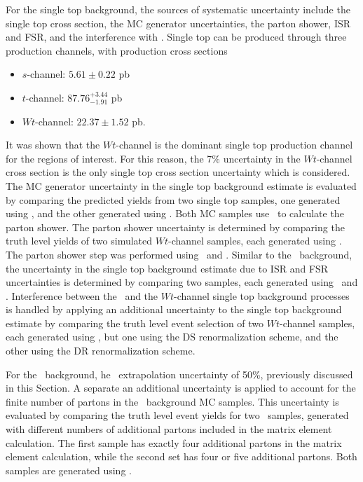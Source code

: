 For the single top background, the sources of systematic uncertainty
include the single top cross section, the MC generator uncertainties, the parton
shower, ISR and FSR, and the interference with \TTBAR.
Single top can be produced through three production channels, with production
cross sections
\begin{itemize}
  \item $s$-channel: $5.61 \pm 0.22$ pb
  \item $t$-channel: $87.76^{+3.44}_{-1.91}$ pb
  \item $Wt$-channel: $22.37 \pm 1.52$ pb.
\end{itemize}
It was shown that the $Wt$-channel is the dominant single top production
channel for the regions of interest.
For this reason, the 7\% uncertainty in the $Wt$-channel cross section is the
only single top cross section uncertainty which is considered.
The MC generator uncertainty in the single top background estimate is evaluated
by comparing the predicted yields from two single top samples, one generated
using \powheg, and the other generated using \mcnlo.
Both MC samples use \herwig\ to calculate the parton shower.
The parton shower uncertainty is determined by comparing the truth level yields
of two simulated $Wt$-channel samples, each generated using \herwig.
The parton shower step was performed using \pythia\ and \herwig.
Similar to the \TTBAR\ background, the uncertainty in the single top background
estimate due to ISR and FSR uncertainties is determined by comparing two
samples, each generated using \acermc\ and \pythia.
Interference between the \TTBAR\ and the $Wt$-channel single top
background processes is handled by applying an additional uncertainty to the
single top background estimate by comparing the truth level event selection of
two $Wt$-channel samples, each generated using \powheg, but one using the DS
renormalization scheme, and the other using the DR renormalization scheme.

For the \ZGAMMAJETS\ background, he \HT\ extrapolation uncertainty of 50\%,
previously discussed in this Section.
A separate an additional uncertainty is applied to account for the finite number of partons in
the \ZGAMMAJETS\ background MC samples.
This uncertainty is evaluated by comparing the truth level event yields for two
\ZGAMMAJETS\ samples, generated with different numbers of additional partons
included in the matrix element calculation.
The first sample has exactly four additional partons in the matrix element
calculation, while the second set has four or five additional partons.
Both samples are generated using \sherpa.

